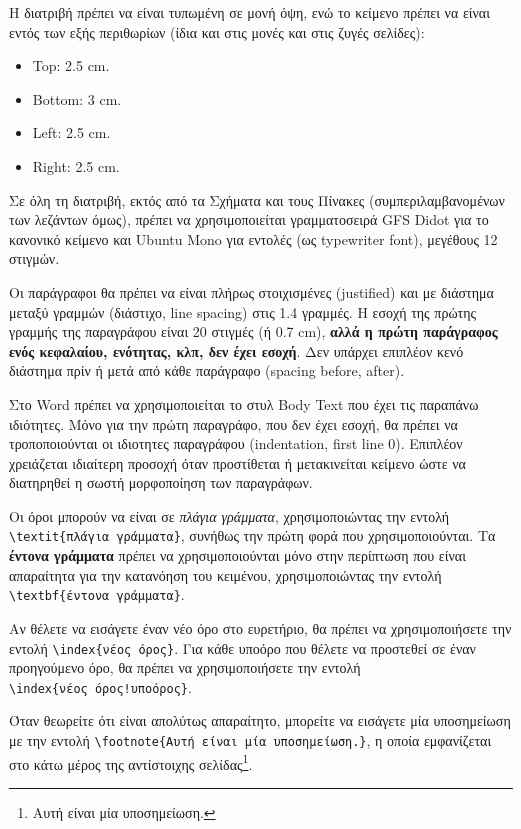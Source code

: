 Η διατριβή πρέπει να είναι τυπωμένη σε μονή όψη, ενώ το κείμενο πρέπει να είναι εντός των εξής περιθωρίων (ίδια και στις μονές και στις ζυγές σελίδες):
\begin{itemize}
	\item Top: 2.5 cm.
	\item Bottom: 3 cm.
	\item Left: 2.5 cm.
	\item Right: 2.5 cm.
\end{itemize}

Σε όλη τη διατριβή, εκτός από τα Σχήματα και τους Πίνακες (συμπεριλαμβανομένων των λεζάντων όμως), πρέπει να χρησιμοποιείται γραμματοσειρά GFS Didot για το κανονικό κείμενο και Ubuntu Mono για εντολές (ως typewriter font), μεγέθους 12 στιγμών.

Οι παράγραφοι θα πρέπει να είναι πλήρως στοιχισμένες (justified) και με διάστημα μεταξύ γραμμών (διάστιχο, line spacing) στις 1.4 γραμμές.
Η εσοχή της πρώτης γραμμής της παραγράφου είναι 20 στιγμές (ή 0.7 cm), \textbf{αλλά η πρώτη παράγραφος ενός κεφαλαίου, ενότητας, κλπ, δεν έχει εσοχή}.
Δεν υπάρχει επιπλέον κενό διάστημα πρίν ή μετά από κάθε παράγραφο (spacing before, after).

Στο Word πρέπει να χρησιμοποιείται το στυλ Body Text που έχει τις παραπάνω ιδιότητες.
Μόνο για την πρώτη παραγράφο, που δεν έχει εσοχή, θα πρέπει να τροποποιούνται οι ιδιοτητες παραγράφου (indentation, first line 0).
Επιπλέον χρειάζεται ιδιαίτερη προσοχή όταν προστίθεται ή μετακινείται κείμενο ώστε να διατηρηθεί η σωστή μορφοποίηση των παραγράφων.

Οι όροι μπορούν να είναι σε \textit{πλάγια γράμματα}, 
χρησιμοποιώντας την εντολή \verb|\textit{πλάγια γράμματα}|, συνήθως την 
πρώτη φορά που χρησιμοποιούνται. Τα \textbf{έντο\-να γράμματα} πρέπει να 
χρησιμοποιούνται μόνο στην περίπτωση που είναι απαραίτητα για την κατανόηση 
του κειμένου, χρησιμοποιώντας την εντολή\\
\verb|\textbf{έντονα γράμματα}|.

Αν θέλετε να εισάγετε έναν νέο όρο στο ευρετήριο, θα πρέπει να χρησιμοποιήσετε 
την εντολή \verb|\index{νέος όρος}|. Για κάθε υποόρο που 
θέλετε να προστεθεί σε έναν προηγούμενο όρο, θα πρέπει να χρησιμοποιήσετε την 
εντολή\\
\verb|\index{νέος όρος!υποόρος}|.

Όταν θεωρείτε ότι είναι απολύτως απαραίτητο, μπορείτε να εισάγετε μία 
υποσημείωση με την εντολή \verb|\footnote{Αυτή είναι μία υποσημείωση.}|, 
η οποία εμφανίζεται στο κάτω μέρος της αντίστοιχης 
σελίδας\footnote{Αυτή είναι μία υποσημείωση.}.

